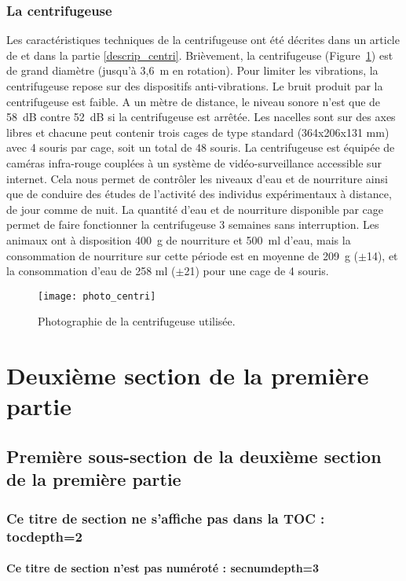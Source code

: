 \subsubsection{La centrifugeuse}
Les caractéristiques techniques de la centrifugeuse ont été décrites dans un article de \cite{jamon_ground-based_2008} et dans la partie \ref{descrip_centri}. Brièvement, la centrifugeuse (Figure~\ref{photo_centri}) est de grand diamètre (jusqu'à 3,6~m en rotation). Pour limiter les vibrations, la centrifugeuse repose sur des dispositifs anti-vibrations. Le bruit produit par la centrifugeuse est faible. A un mètre de distance, le niveau sonore n'est que de 58~dB contre 52~dB si la centrifugeuse est arrêtée. Les nacelles sont sur des axes libres et chacune peut contenir trois cages de type standard (364x206x131 mm) avec 4 souris par cage, soit un total de 48 souris. La centrifugeuse est équipée de caméras infra-rouge couplées à un système de vidéo-surveillance accessible sur internet. Cela nous permet de contrôler les niveaux d'eau et de nourriture ainsi que de conduire des études de l'activité des individus expérimentaux à distance, de jour comme de nuit. La quantité d'eau et de nourriture disponible par cage permet de faire fonctionner la centrifugeuse 3 semaines sans interruption. Les animaux ont à disposition 400~g de nourriture et 500~ml d'eau, mais la consommation de nourriture sur cette période est en moyenne de 209~g ($\pm$14), et la consommation d'eau de 258 ml ($\pm$21) pour une cage de 4 souris. 
\begin{figure}[h!tbp]
\vspace{0.5cm}
\setcapindent{2em}
  \centering
  \texttt{[image: photo\_centri]}
  \caption[Photographie de la centrifugeuse]{Photographie de la centrifugeuse utilisée. \label{photo_centri}}
\end{figure}
\lipsum[1]
\section{Deuxième section de la première partie}
\subsection{Première sous-section de la deuxième section de la première partie}
\lipsum[1-2]
\subsubsection{Ce titre de section ne s'affiche pas dans la TOC : tocdepth=2}
\lipsum[1]
\paragraph{Ce titre de section n'est pas numéroté : secnumdepth=3}~~\\ %

\lipsum[1]